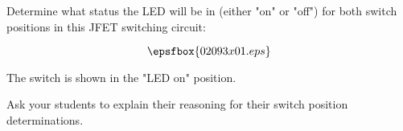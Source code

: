 

Determine what status the LED will be in (either "on" or "off") for both switch positions in this JFET switching circuit:

$$\epsfbox{02093x01.eps}$$







The switch is shown in the "LED on" position.







Ask your students to explain their reasoning for their switch position determinations.




